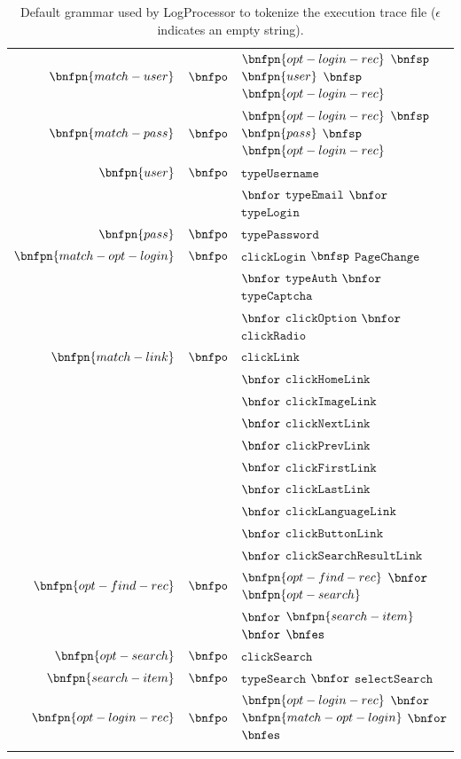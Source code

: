 \documentclass[conference]{IEEEtran}
\begin{document}
\begin{table}[!htb]
\begin{tabular}{rcl}
  $\bnfpn{match-user}$ & $\bnfpo$ &  $\bnfpn{opt-login-rec}$ $\bnfsp$ $\bnfpn{user}$ $\bnfsp$ $\bnfpn{opt-login-rec}$ \\
  
  $\bnfpn{match-pass}$ & $\bnfpo$ &  $\bnfpn{opt-login-rec}$ $\bnfsp$ $\bnfpn{pass}$ $\bnfsp$ $\bnfpn{opt-login-rec}$ \\
  
  $\bnfpn{user}$ & $\bnfpo$ &  $\texttt{typeUsername}$ \\
  & & $\bnfor$ $\texttt{typeEmail}$ $\bnfor$ $\texttt{typeLogin}$ \\
  
  $\bnfpn{pass}$ & $\bnfpo$ &  $\texttt{typePassword}$ \\
  
  $\bnfpn{match-opt-login}$ & $\bnfpo$ &  $\texttt{clickLogin}$ $\bnfsp$ $\texttt{PageChange}$ \\
  & & $\bnfor$ $\texttt{typeAuth}$ $\bnfor$ $\texttt{typeCaptcha}$ \\
  & & $\bnfor$ $\texttt{clickOption}$ $\bnfor$ $\texttt{clickRadio}$ \\
  
  $\bnfpn{match-link}$ & $\bnfpo$ &  $\texttt{clickLink}$ \\
   & & $\bnfor$ $\texttt{clickHomeLink}$ \\
   & & $\bnfor$ $\texttt{clickImageLink}$ \\
   & & $\bnfor$ $\texttt{clickNextLink}$ \\
   & & $\bnfor$ $\texttt{clickPrevLink}$ \\
   & & $\bnfor$ $\texttt{clickFirstLink}$ \\
   & & $\bnfor$ $\texttt{clickLastLink}$ \\
   & & $\bnfor$ $\texttt{clickLanguageLink}$ \\
   & & $\bnfor$ $\texttt{clickButtonLink}$ \\
   & & $\bnfor$ $\texttt{clickSearchResultLink}$ \\
  
  $\bnfpn{opt-find-rec}$ & $\bnfpo$ &  $\bnfpn{opt-find-rec}$ $\bnfor$ $\bnfpn{opt-search}$ \\
  & & $\bnfor$ $\bnfpn{search-item}$ $\bnfor$ $\bnfes$ \\
  
  $\bnfpn{opt-search}$ & $\bnfpo$ &  $\texttt{clickSearch}$ \\
  
  $\bnfpn{search-item}$ & $\bnfpo$ &  $\texttt{typeSearch}$ $\bnfor$ $\texttt{selectSearch}$ \\
  
  $\bnfpn{opt-login-rec}$ & $\bnfpo$ &  $\bnfpn{opt-login-rec}$ $\bnfor$ $\bnfpn{match-opt-login}$ $\bnfor$ $\bnfes$ \\
  & & \\
  \end{tabular}
\caption{Default grammar used by LogProcessor to tokenize the execution trace file ($\epsilon$ indicates an empty string).}
\label{tab:grammar}
\end{table}
\end{document}
